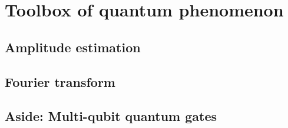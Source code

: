 \chapter{Toolbox of quantum phenomenon}
\label{chap:circuits}

\section{Amplitude estimation}

\section{Fourier transform}

\section{Aside: Multi-qubit quantum gates}


